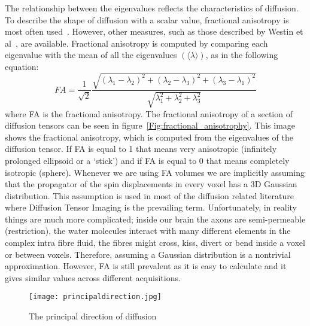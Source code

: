 The relationship between the eigenvalues reflects the characteristics of diffusion. To describe the shape of diffusion with a scalar value, fractional anisotropy is most often used~\cite{bihan2001tensor}. However, other measures, such as those described by Westin et al~\cite{westin2002processing}, are available. Fractional anisotropy is computed by comparing each eigenvalue with the mean of all the eigenvalues $(\langle \lambda \rangle)$, as in the following equation:
\begin{equation}
   FA=\frac{1}{\sqrt{2}}\frac{\sqrt{(\lambda_{1}-\lambda_{2})^{2}+(\lambda_{2}-\lambda_{3})^{2}+(\lambda_{3}-\lambda_{1})^{2}}}{\sqrt{\lambda_{1}^{2}+\lambda_{2}^{2}+\lambda_{3}^{2}}}
   \label{Equ:FA}	
\end{equation}
where FA is the fractional anisotropy. The fractional anisotropy of a section of diffusion tensors can be seen in figure~\ref{Fig:fractional_anisotrophy}. This image shows the fractional anisotropy, which is computed from the eigenvalues of the diffusion tensor. If FA is equal to 1 that means very anisotropic (infinitely prolonged ellipsoid or a ‘stick’) and if FA is equal to 0 that means completely isotropic (sphere). Whenever we are using FA volumes we are implicitly assuming that the propagator of the spin displacements in every voxel has a 3D Gaussian distribution. This assumption is used in most of the diffusion related literature where Diffusion Tensor Imaging is the prevailing term. Unfortunately, in reality things are much more complicated; inside our brain the axons are semi-permeable (restriction), the water molecules interact with many different elements in the complex intra fibre fluid, the fibres might cross, kiss, divert or bend inside a voxel or between voxels. Therefore, assuming a Gaussian distribution is a nontrivial approximation. However, FA is still prevalent as it is easy to calculate and it gives similar values across different acquisitions.

\begin{figure} 
  \centering 
  \texttt{[image: principaldirection.jpg]}
  \caption{The principal direction of diffusion}
  \label{Fig:principal_direction_diffusion}
\end{figure}


